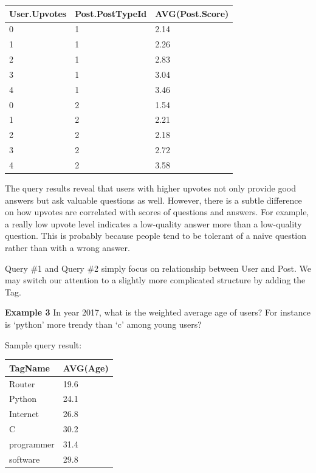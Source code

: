 \begin {center}
\begin{tabular}{ l l l }
	User.Upvotes&Post.PostTypeId&AVG(Post.Score)\\\hline
	0&1&2.14\\
	1&1&2.26\\
	2&1&2.83\\
	3&1&3.04\\
	4&1&3.46\\
	0&2&1.54\\
	1&2&2.21\\
	2&2&2.18\\
	3&2&2.72\\
	4&2&3.58\\\hline
\end{tabular}
\end {center}

The query results reveal that users with higher upvotes not only provide good answers but ask valuable questions as well. However, there is a subtle difference on how upvotes are correlated with scores of questions and answers. For example, a really low upvote level indicates a low-quality answer more than a low-quality question. This is probably because people tend to be tolerant of a naive question rather than with a wrong answer.

Query \#1 and Query \#2 simply focus on relationship between User and Post. We may switch our attention to a slightly more complicated structure by adding the Tag.

\noindent\textbf{Example 3} In year 2017, what is the weighted average age of users? For instance is ‘python’ more trendy than ‘c’ among young users?


Sample query result:

\begin {center}
\begin{tabular}{ l l  }
	
	TagName&AVG(Age)\\\hline
	Router&19.6\\
	Python&24.1\\
	Internet&26.8\\
	C&30.2\\
	programmer&31.4\\
	software&29.8\\\hline
	
\end{tabular}
\end {center}

